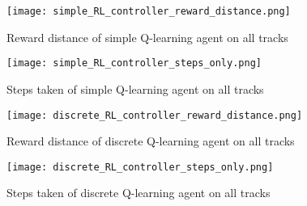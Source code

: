 \documentclass{article}
\begin{document}
\begin{figure}[htbp]
    \centering
    \texttt{[image: simple\_RL\_controller\_reward\_distance.png]}
    \caption{Reward distance of simple Q-learning agent on all tracks}
    \label{simple_RL_controller_reward_distance}
\end{figure}

\begin{figure}[htbp]
    \centering
    \texttt{[image: simple\_RL\_controller\_steps\_only.png]}
    \caption{Steps taken of simple Q-learning agent on all tracks}
    \label{simple_RL_controller_steps_only}
\end{figure}


\begin{figure}[htbp]
    \centering
    \texttt{[image: discrete\_RL\_controller\_reward\_distance.png]}
    \caption{Reward distance of discrete Q-learning agent on all tracks}
    \label{discrete_RL_controller_reward_distance}
\end{figure}

\begin{figure}[htbp]
    \centering
    \texttt{[image: discrete\_RL\_controller\_steps\_only.png]}
    \caption{Steps taken of discrete Q-learning agent on all tracks}
    \label{discrete_RL_controller_steps_only}
\end{figure}
\end{document}
